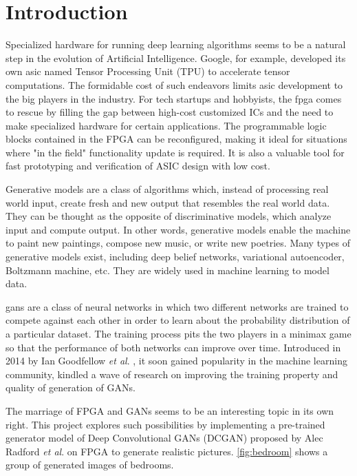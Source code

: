 
\chapter{Introduction}

Specialized hardware for running deep learning algorithms seems to be a natural step in the evolution of
Artificial Intelligence.  Google, for example, developed its own \gls{asic} named Tensor Processing Unit (TPU)
to accelerate tensor computations. The formidable cost of such endeavors limits \gls{asic} development to
the big players in the industry. For tech startups and hobbyists, the \gls{fpga} comes to rescue by filling
the gap between high-cost customized ICs and the need to make specialized hardware for certain
applications. The programmable logic blocks contained in the FPGA can be reconfigured, making it ideal for
situations where "in the field" functionality update is required. It is also a valuable tool for fast
prototyping and verification of ASIC design with low cost.

Generative models are a class of algorithms which, instead of processing real world input, create fresh and
new output that resembles the real world data. They can be thought as the opposite of discriminative models,
which analyze input and compute output. In other words, generative models enable the machine to paint new
paintings, compose new music, or write new poetries. Many types of generative models exist, including deep
belief networks, variational autoencoder, Boltzmann machine, etc. They are widely used in machine learning
to model data.

\gls{gans} are a class of neural networks in which two different networks are trained to compete against
each other in order to learn about the probability distribution of a particular dataset. The training
process pits the two players in a minimax game so that the performance of both networks can improve over
time. Introduced in 2014 by Ian Goodfellow \textit{et al}. \cite{goodfellow:gan}, it soon gained popularity
in the machine learning community, kindled a wave of research on improving the training property and
quality of generation of GANs.

The marriage of FPGA and GANs seems to be an interesting topic in its own right. This project explores such
possibilities by implementing a pre-trained generator model of Deep Convolutional GANs (DCGAN) proposed by
Alec Radford \textit{et al}. \cite{radford:conv_gan} on FPGA to generate realistic pictures.
\ref{fig:bedroom} shows a group of generated images of bedrooms.

